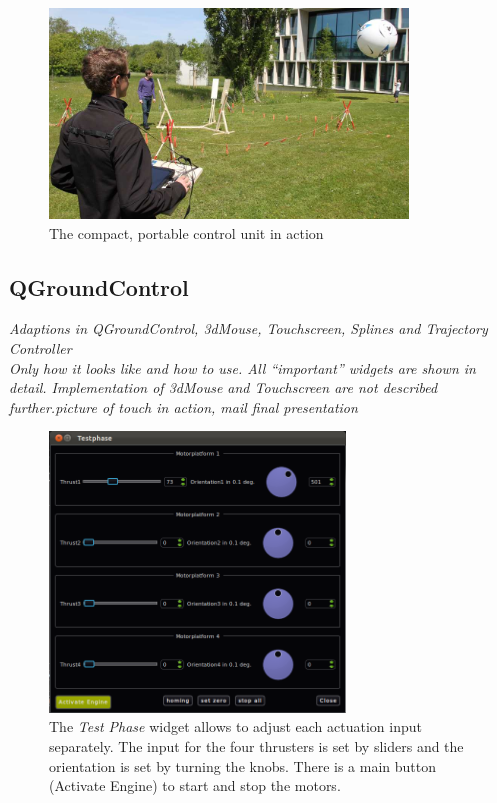 \begin{figure}[H]
	\begin{center}
		\includegraphics[width=0.85\textwidth]{graphics/HMI_in_Action}
		\caption{The compact, portable control unit in action}  
		\label{fig:HMI_in_Action}
	\end{center}
\end{figure}



\subsection{QGroundControl}
\label{subsec:qGroundControl}
\textit{Adaptions in QGroundControl, 3dMouse, Touchscreen, Splines and Trajectory Controller \\ Only how it looks like and how to use. All ``important'' widgets are shown in detail. Implementation of 3dMouse and Touchscreen are not described further.picture of touch in action, mail final presentation}


\begin{figure}[H] %
	\begin{center}
		\includegraphics[width=0.7\textwidth]{qgc_test_phase}
		\caption[Test Phase realization]{The \textit{Test Phase} widget allows to adjust each actuation input separately. The input for the four thrusters is set by sliders and the orientation is set by turning the knobs. There is a main button (Activate Engine) to start and stop the motors.}  
		\label{figure:qgc_test_phase}
	\end{center}
\end{figure}

